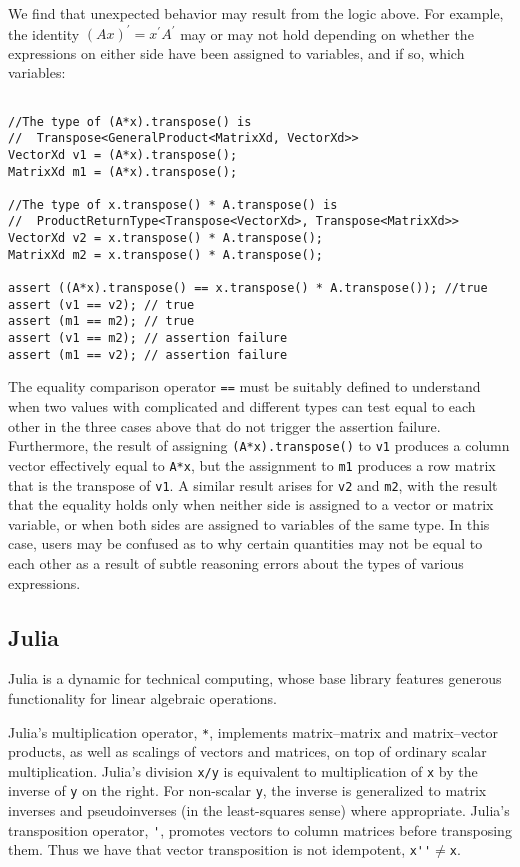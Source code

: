 We find that unexpected behavior may result from the logic above. For example, the identity $(Ax)^\prime = x^\prime A^\prime$ may or may not hold depending on whether the expressions on either side have been assigned to variables, and if so, which variables:
%
\begin{verbatim}

//The type of (A*x).transpose() is
//  Transpose<GeneralProduct<MatrixXd, VectorXd>>
VectorXd v1 = (A*x).transpose();
MatrixXd m1 = (A*x).transpose();

//The type of x.transpose() * A.transpose() is
//  ProductReturnType<Transpose<VectorXd>, Transpose<MatrixXd>>
VectorXd v2 = x.transpose() * A.transpose();
MatrixXd m2 = x.transpose() * A.transpose();

assert ((A*x).transpose() == x.transpose() * A.transpose()); //true
assert (v1 == v2); // true
assert (m1 == m2); // true
assert (v1 == m2); // assertion failure
assert (m1 == v2); // assertion failure

\end{verbatim}
%
The equality comparison operator \verb|==| must be suitably defined to understand when two values with complicated and different types can test equal to each other in the three cases above that do not trigger the assertion failure. Furthermore, the result of assigning \verb|(A*x).transpose()| to  \verb|v1| produces a column vector effectively equal to \verb|A*x|,
but the assignment to \verb|m1| produces a row matrix that is the transpose of \verb|v1|.
A similar result arises for \verb|v2| and \verb|m2|, with the result that the
equality holds only when neither side is assigned to a vector or matrix
variable, or when both sides are assigned to variables of the same type. In
this case, users may be confused as to why certain quantities may not be equal
to each other as a result of subtle reasoning errors about the types of various
expressions.


\subsection{Julia}

Julia is a dynamic for technical computing, whose base library features
generous functionality for linear algebraic operations.~\cite{Bezanson2012}

Julia's multiplication operator, \verb|*|, implements matrix--matrix and
matrix--vector products, as well as scalings of vectors and matrices, on top of
ordinary scalar multiplication.
Julia's division \verb|x/y| is equivalent to multiplication of \verb|x| by the
inverse of \verb|y| on the right. For non-scalar \verb|y|, the inverse is
generalized to matrix inverses and pseudoinverses (in the least-squares sense)
where appropriate.
Julia's transposition operator, \verb|'|, promotes vectors to column matrices
before transposing them. Thus we have that vector transposition is not
idempotent, \verb|x''|$\ne$\verb|x|. 

